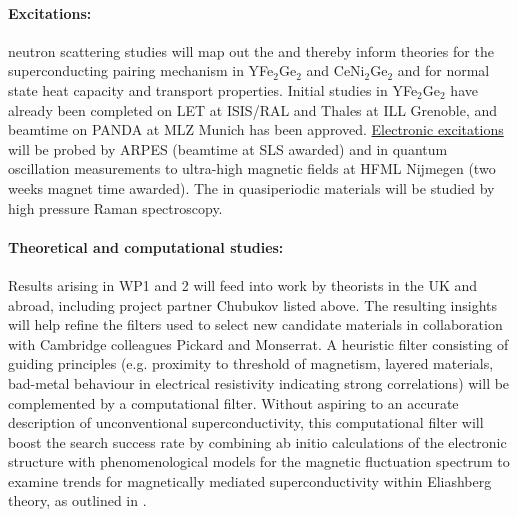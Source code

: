 
 

\paragraph{Excitations:}
neutron scattering studies will map out the  and thereby inform theories for the superconducting pairing mechanism in YFe$_2$Ge$_2$ and CeNi$_2$Ge$_2$ and for normal state heat
capacity \cite{hayden00} and transport properties. 
Initial studies in YFe$_2$Ge$_2$ have already been completed  on LET at ISIS/RAL and Thales at ILL Grenoble, %
and beamtime on PANDA at MLZ Munich has been approved. \ul{Electronic excitations} will be probed by ARPES (beamtime at SLS awarded) and in quantum oscillation measurements to ultra-high magnetic fields at HFML Nijmegen (two weeks magnet time awarded). The  in quasiperiodic materials will be studied by high pressure Raman spectroscopy.

\paragraph{Theoretical and computational studies:}
Results arising in WP1 and 2 will feed into work by theorists in the UK and abroad, including project partner Chubukov listed above. %
The resulting insights will help refine the filters used to select new candidate materials in collaboration with Cambridge colleagues Pickard and Monserrat. A heuristic filter consisting of guiding principles (e.g. proximity to threshold of magnetism, layered materials, bad-metal behaviour in electrical resistivity indicating strong correlations) will be complemented by a computational filter.
Without aspiring to an accurate description of unconventional superconductivity, this computational filter will boost the search success rate by combining ab initio calculations of the electronic structure with phenomenological models for the magnetic fluctuation spectrum to examine trends for magnetically mediated superconductivity within Eliashberg theory, as outlined  in \cite{monthoux07}.  

